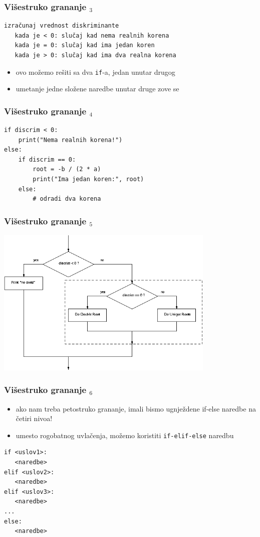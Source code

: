 \documentclass[utf8,compress]{beamer}
\begin{document}
\begin{frame}[fragile]
  \frametitle{Višestruko grananje $_3$}
\begin{verbatim}
izračunaj vrednost diskriminante
   kada je < 0: slučaj kad nema realnih korena
   kada je = 0: slučaj kad ima jedan koren
   kada je > 0: slučaj kad ima dva realna korena
\end{verbatim}
  \begin{itemize}
    \item ovo možemo rešiti sa dva \texttt{if}-a, jedan unutar drugog
    \item umetanje jedne složene naredbe unutar druge zove se 
  \end{itemize}
\end{frame}

\begin{frame}[fragile]
  \frametitle{Višestruko grananje $_4$}
\begin{verbatim}
if discrim < 0:
    print("Nema realnih korena!")
else:
    if discrim == 0:
        root = -b / (2 * a)
        print("Ima jedan koren:", root)
    else:
        # odradi dva korena
\end{verbatim}
\end{frame}

\begin{frame}[fragile]
  \frametitle{Višestruko grananje $_5$}
\begin{center}
  \includegraphics[width=10.5cm]{pic16}
\end{center}
\end{frame}

\begin{frame}[fragile]
  \frametitle{Višestruko grananje $_6$}
  \begin{itemize}
    \item ako nam treba petostruko grananje, imali bismo ugnježdene if-else naredbe na četiri nivoa!
    \item umesto rogobatnog uvlačenja, možemo koristiti \texttt{if-elif-else} naredbu
  \end{itemize}
\begin{verbatim}
if <uslov1>:
   <naredbe>
elif <uslov2>:
   <naredbe>
elif <uslov3>:
   <naredbe>
...
else:
   <naredbe>
\end{verbatim}
\end{frame}
\end{document}
